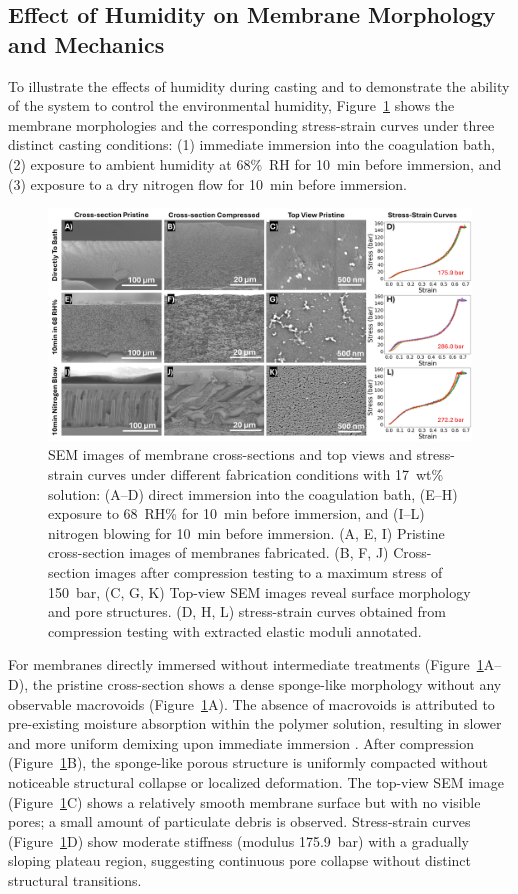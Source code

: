 \documentclass[preprint,12pt,times]{elsarticle}
\begin{document}
\subsection{Effect of Humidity on Membrane Morphology and Mechanics}
\label{Effect of Humidity on Membrane Morphology and Mechanics}
To illustrate the effects of humidity during casting and to demonstrate the ability of the system to control the environmental humidity, Figure~\ref{sems.jpg} shows the membrane morphologies and the corresponding stress-strain curves under three distinct casting conditions: (1) immediate immersion into the coagulation bath, (2) exposure to ambient humidity at 68\%~RH for 10~min before immersion, and (3) exposure to a dry nitrogen flow for 10~min before immersion. 

\begin{figure}[!ht]
\centering
\includegraphics[width=\linewidth]{sems.jpg}
\caption{SEM images of membrane cross-sections and top views and stress-strain curves under different fabrication conditions with 17~wt\% solution: (A--D) direct immersion into the coagulation bath, (E--H) exposure to 68~RH\% for 10~min before immersion, and (I--L) nitrogen blowing for 10~min before immersion. (A, E, I) Pristine cross-section images of membranes fabricated. (B, F, J) Cross-section images after compression testing to a maximum stress of 150~bar, (C, G, K) Top-view SEM images reveal surface morphology and pore structures. (D, H, L) stress-strain curves obtained from compression testing with extracted elastic moduli annotated.}
\label{sems.jpg}
\end{figure}

For membranes directly immersed without intermediate treatments (Figure~\ref{sems.jpg}A--D), the pristine cross-section shows a dense sponge-like morphology without any observable macrovoids (Figure~\ref{sems.jpg}A). The absence of macrovoids is attributed to pre-existing moisture absorption within the polymer solution, resulting in slower and more uniform demixing upon immediate immersion \cite{Padilha2019}. After compression (Figure~\ref{sems.jpg}B), the sponge-like porous structure is uniformly compacted without noticeable structural collapse or localized deformation. The top-view SEM image (Figure~\ref{sems.jpg}C) shows a relatively smooth membrane surface but with no visible pores; a small amount of particulate debris is observed. Stress-strain curves (Figure~\ref{sems.jpg}D) show moderate stiffness (modulus 175.9~bar) with a gradually sloping plateau region, suggesting continuous pore collapse without distinct structural transitions.
\end{document}
